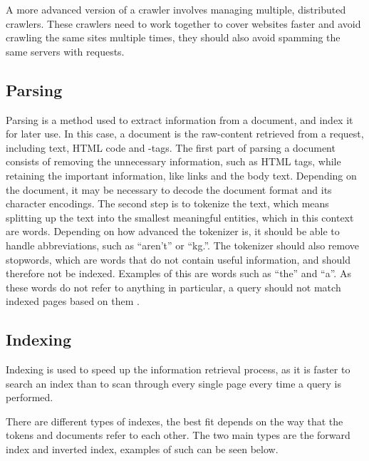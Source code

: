 
A more advanced version of a crawler involves managing multiple, distributed
crawlers. These crawlers need to work together to cover websites faster and
avoid crawling the same sites multiple times, they should also avoid spamming
the same servers with requests.


\subsection{Parsing} \label{sec:parsing}
Parsing is a method used to extract information from a document, and index it
for later use. In this case, a document is the raw-content retrieved from a request,
including text, HTML code and -tags.
The first part of parsing a document consists of removing the unnecessary
information, such as HTML tags, while retaining the important information, like
links and the body text. Depending on the document, it may be necessary to
decode the document format and its character encodings.
The second step is to tokenize the text, which means splitting up the text into
the smallest meaningful entities, which in this context are words. Depending on
how advanced the tokenizer is, it should be able to handle abbreviations, such
as ``aren't'' or ``kg.''. The tokenizer should also remove stopwords, which are
words that do not contain useful information, and should therefore not
be indexed. Examples of this are words such as ``the'' and ``a''. As these words
do not refer to anything in particular, a query should not match indexed pages
based on them \citep[Ch. 2]{manning2008introduction}. 

\subsection{Indexing}
Indexing is used to speed up the information retrieval process, as it is faster
to search an index than to scan through every single page every time a query is
performed.

There are different types of indexes, the best fit depends on the way
that the tokens and documents refer to each other. The two main types are the
forward index and inverted index, examples of such can be seen below.

